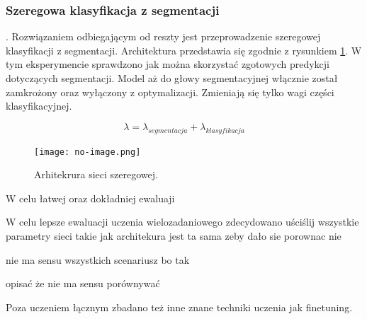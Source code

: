 \subsubsection{Szeregowa klasyfikacja z segmentacji}.
Rozwiązaniem odbiegającym od reszty jest przeprowadzenie szeregowej klasyfikacji z segmentacji. Architektura przedstawia się zgodnie z rysunkiem \ref{fig:multitask-parrarel}. W tym eksperymencie sprawdzono jak można skorzystać zgotowych predykcji dotyczących segmentacji. Model aż do głowy segmentacyjnej włącznie został zamkrożony oraz wyłączony z optymalizacji. Zmieniają się tylko wagi części klasyfikacyjnej.

\begin{equation*}
    \lambda = \lambda_{segmentacja} + \lambda_{klasyfikacja}
\end{equation*}







\begin{figure}[ht!]
    \centering
    \texttt{[image: no-image.png]}
    \caption{Arhitekrura sieci szeregowej.}
    \label{fig:multitask-parrarel}
\end{figure}

W celu łatwej oraz dokładniej ewaluaji 

W celu lepsze ewaluacji uczenia wielozadaniowego zdecydowano uściślij wszystkie parametry sieci takie jak architekura jest ta sama zeby dało sie porownac nie

nie ma sensu wszystkich scenariusz bo tak

opisać że nie ma sensu porównywać 



Poza uczeniem łącznym zbadano też inne znane techniki uczenia jak finetuning.



